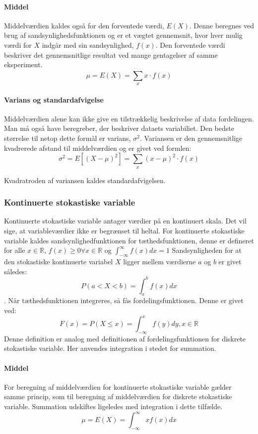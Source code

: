 \paragraph{Middel} Middelværdien kaldes også for den forventede værdi, $E(X)$. Denne beregnes ved brug af sandsynlighedsfunktionen og er et vægtet gennemsnit, hvor hver mulig værdi for $X$ indgår med sin sandsynlighed, $f(x)$. Den forventede værdi beskriver det gennemsnitlige resultat ved mange gentagelser af samme eksperiment.
$$\mu=E(X)=\sum_{x}^{}x \cdot f(x)$$

\paragraph{Varians og standardafvigelse} Middelværdien alene kan ikke give en tilstrækkelig beskrivelse af data fordelingen. Man må også have beregreber, der beskriver dataets variabiliet. Den bedste størrelse til netop dette formål er varians, $\sigma ^2$. Variansen er den gennemsnitlige kvadrerede afstand til middelværdien og er givet ved formlen:
$$\sigma ^2=E[(X-\mu)^2]=\sum_{x}^{}(x-\mu)^2 \cdot f(x)$$

Kvadratroden af variansen kaldes standardafvigelsen. 

\subsubsection{Kontinuerte stokastiske variable}
Kontinuerte stokastiske variable antager værdier på en kontinuert skala. Det vil sige, at variableværdier ikke er begrænset til heltal. For kontinuerte stokastiske variable kaldes sandsynlighedfunktionen for tæthedsfunktionen, denne er defineret for alle $x \in \mathbb{R}$, $f(x) \ge 0 \forall x \in \mathbb{R}$ og $\int_{-\infty}^{\infty} f(x) dx = 1$
Sandsynligheden for at den stokastiske kontinuerte variabel $X$ ligger mellem værdierne $a$ og $b$ er givet således: $$P(a<X<b)=\int_{a}^{b}f(x)dx$$. Når tæthedsfunktionen integreres, så fås fordelingsfunktionen. Denne er givet ved:
$$F(x)=P(X \le x) = \int_{-\infty}^{x}f(y)dy, x\in \mathbb{R}$$
Denne definition er analog med definitionen af fordelingsfunktionen for diskrete stokastiske variable. Her anvendes integration i stedet for summation.

\paragraph{Middel} For beregning af middelværdien for kontinuerte stokastiske variable gælder samme princip, som til beregning af middelværdien for diskrete stokastiske variable. Summation udskiftes ligeledes med integration i dette tilfælde.
$$\mu=E(X)=\int_{-\infty}^{\infty}xf(x)dx$$

